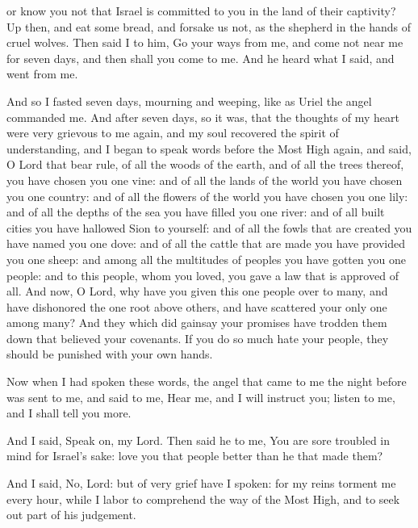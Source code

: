 {or know you not that Israel is committed to you in the land of their captivity?
Up then, and eat some bread, and forsake us not, as the shepherd
{} in the hands of cruel wolves.
Then said I to him, Go your ways from me, and come not near me for seven days, and then shall you come to me. And he heard what I said, and went from me.
\par }{\PP {}And so I fasted seven days, mourning and weeping, like as Uriel the angel commanded me.
And after seven days, so it was, that the thoughts of my heart were very grievous to me again,
and my soul recovered the spirit of understanding, and I began to speak words before the Most High again,
and said, O Lord that bear rule, of all the woods of the earth, and of all the trees thereof, you have chosen you one vine:
and of all the lands of the world you have chosen you one
 country: and of all the flowers of the world you have chosen you one lily:
and of all the depths of the sea you have filled you one river: and of all built cities you have hallowed Sion to yourself:
and of all the fowls that are created you have named you one dove: and of all the cattle that are made you have provided you one sheep:
and among all the multitudes of peoples you have gotten you one people: and to this people, whom you loved, you gave a law that is approved of all.
And now, O Lord, why have you given this one people over to many, and
 have dishonored the one root above others, and have scattered your only one among many?
And they which did gainsay your promises have trodden them down that believed your covenants.
If you do so much hate your people, they should be punished with your own hands.
\par }{\PP {}Now when I had spoken these words, the angel that came to me the night before was sent to me,
and said to me, Hear me, and I will instruct you; listen to me, and I shall tell you more.
\par }{\PP {}And I said, Speak on, my Lord. Then said he to me, You are sore troubled in mind for Israel’s sake: love you that people better than he that made them?
\par }{\PP {}And I said, No, Lord: but of very grief have I spoken: for my reins torment me every hour, while I labor to comprehend the way of the Most High, and to seek out part of his judgement.
}
